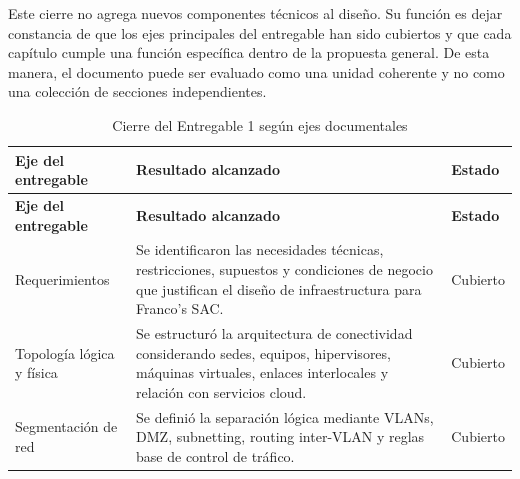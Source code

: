 \documentclass[11pt, a4paper, oneside]{report}
\begin{document}
Este cierre no agrega nuevos componentes técnicos al diseño. Su función es dejar constancia de que los ejes principales del entregable han sido cubiertos y que cada capítulo cumple una función específica dentro de la propuesta general. De esta manera, el documento puede ser evaluado como una unidad coherente y no como una colección de secciones independientes.

\renewcommand{\arraystretch}{1.3}
\footnotesize
{}

\begin{xltabular}{\textwidth}{@{}|L{3.5cm}|X|L{2.4cm}|@{}}
\caption{Cierre del Entregable 1 según ejes documentales}
\label{tab:cierre_entregable_1_ejes_documentales} \\

\parbox[c][1.1cm][c]{\linewidth}{\centering\color{white}\bfseries\small Eje del entregable} &
\parbox[c][1.1cm][c]{\linewidth}{\centering\color{white}\bfseries\small Resultado alcanzado} &
\parbox[c][1.1cm][c]{\linewidth}{\centering\color{white}\bfseries\small Estado} \\ \hline
\endfirsthead

\parbox[c][1.1cm][c]{\linewidth}{\centering\color{white}\bfseries\small Eje del entregable} &
\parbox[c][1.1cm][c]{\linewidth}{\centering\color{white}\bfseries\small Resultado alcanzado} &
\parbox[c][1.1cm][c]{\linewidth}{\centering\color{white}\bfseries\small Estado} \\ \hline
\endhead

\hline
\endfoot

{\small Requerimientos} &
{\small Se identificaron las necesidades técnicas, restricciones, supuestos y condiciones de negocio que justifican el diseño de infraestructura para Franco's SAC.} &
{\small Cubierto} \\ \hline

{\small Topología lógica y física} &
{\small Se estructuró la arquitectura de conectividad considerando sedes, equipos, hipervisores, máquinas virtuales, enlaces interlocales y relación con servicios cloud.} &
{\small Cubierto} \\ \hline

{\small Segmentación de red} &
{\small Se definió la separación lógica mediante VLANs, DMZ, subnetting, routing inter-VLAN y reglas base de control de tráfico.} &
{\small Cubierto} \\ \hline


\end{xltabular}
\end{document}
